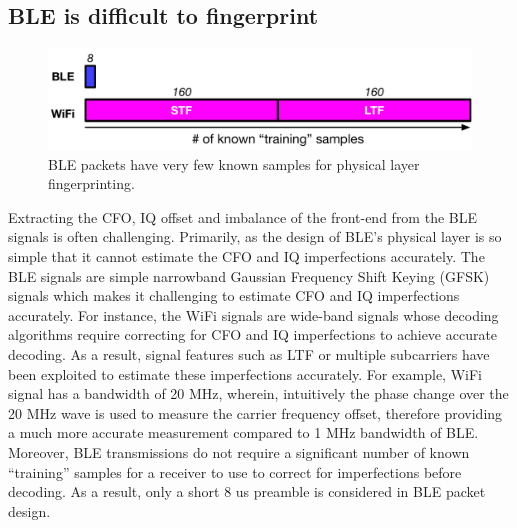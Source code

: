 \subsection{BLE is difficult to fingerprint} %
\label{sec:motivation:diff}

\begin{figure}
    \centering
    \includegraphics[width=\linewidth]{plots/knownsamples}
    \caption{
      BLE packets have very few known samples for physical layer fingerprinting.
    \label{fig:2}
  }
\end{figure}


%
% 



Extracting the CFO, IQ offset and imbalance of the front-end from the BLE signals is often challenging.  
%
Primarily, as the design of BLE's physical layer is so simple that it cannot 
estimate the CFO and IQ imperfections accurately.
The BLE signals are simple narrowband Gaussian Frequency Shift Keying (GFSK) signals which makes it challenging to estimate
CFO and IQ imperfections accurately. For instance, the WiFi signals are wide-band signals
whose decoding algorithms require correcting for CFO and IQ imperfections to achieve accurate decoding. As a result, signal features such as LTF or multiple subcarriers have been exploited to estimate these imperfections accurately. For example, WiFi signal has a bandwidth of 20 MHz, wherein, intuitively the phase change over the 20 MHz wave is used to measure the 
carrier frequency offset, therefore providing a much more accurate measurement compared to 1 MHz bandwidth of BLE. Moreover, BLE transmissions do not require a significant number of known ``training''
samples for a receiver to use to correct for imperfections before decoding. As a result, only a short 8 us preamble is considered in BLE packet design.

